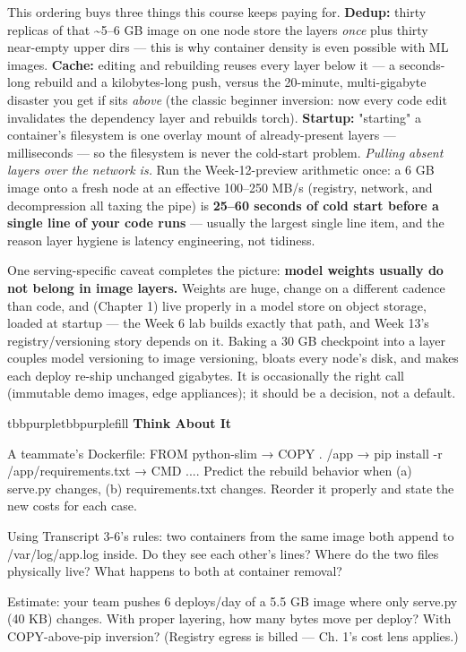 This ordering buys three things this course keeps paying for. \textbf{Dedup:} thirty replicas of that \textasciitilde{}5–6 GB image on one node store the layers \textit{once} plus thirty near-empty upper dirs — this is why container density is even possible with ML images. \textbf{Cache:} editing  and rebuilding reuses every layer below it — a seconds-long rebuild and a kilobytes-long push, versus the 20-minute, multi-gigabyte disaster you get if  sits \textit{above}  (the classic beginner inversion: now every code edit invalidates the dependency layer and rebuilds torch). \textbf{Startup:} "starting" a container's filesystem is one overlay mount of already-present layers — milliseconds — so the filesystem is never the cold-start problem. \textit{Pulling absent layers over the network is.} Run the Week-12-preview arithmetic once: a 6 GB image onto a fresh node at an effective 100–250 MB/s (registry, network, and decompression all taxing the pipe) is \textbf{25–60 seconds of cold start before a single line of your code runs} — usually the largest single line item, and the reason layer hygiene is latency engineering, not tidiness.

One serving-specific caveat completes the picture: \textbf{model weights usually do not belong in image layers.} Weights are huge, change on a different cadence than code, and (Chapter 1) live properly in a model store on object storage, loaded at startup — the Week 6 lab builds exactly that path, and Week 13's registry/versioning story depends on it. Baking a 30 GB checkpoint into a layer couples model versioning to image versioning, bloats every node's disk, and makes each deploy re-ship unchanged gigabytes. It is occasionally the right call (immutable demo images, edge appliances); it should be a decision, not a default.

\begin{calloutbox}{tbbpurple}{tbbpurplefill}
{\normalsize\bfseries\color{tbbpurple}Think About It}\par\vspace{3pt}
\begin{tbbitemize}
  \item A teammate's Dockerfile: FROM python-slim → COPY . /app → pip install -r /app/requirements.txt → CMD .... Predict the rebuild behavior when (a) serve.py changes, (b) requirements.txt changes. Reorder it properly and state the new costs for each case.
  \item Using Transcript 3-6's rules: two containers from the same image both append to /var/log/app.log inside. Do they see each other's lines? Where do the two files physically live? What happens to both at container removal?
  \item Estimate: your team pushes 6 deploys/day of a 5.5 GB image where only serve.py (40 KB) changes. With proper layering, how many bytes move per deploy? With COPY-above-pip inversion? (Registry egress is billed — Ch. 1's cost lens applies.)
\end{tbbitemize}
\end{calloutbox}

